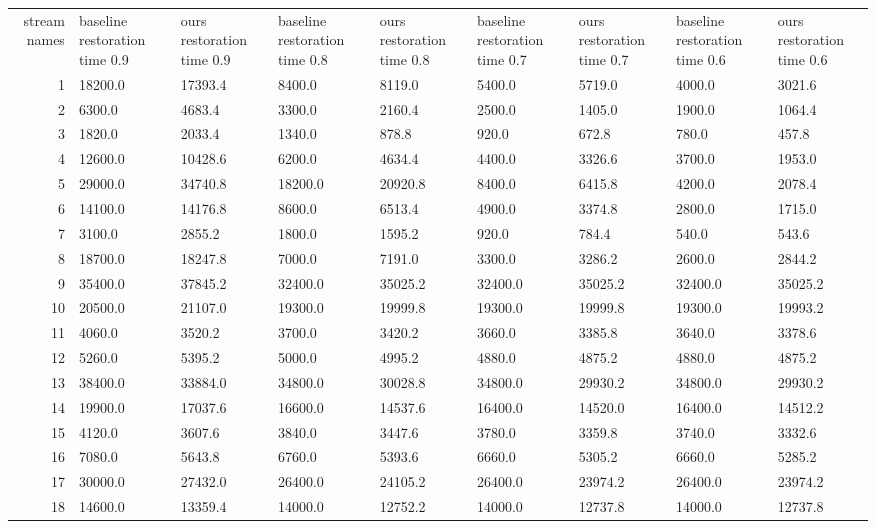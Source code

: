 \begin{tabular}{|r|l|l|l|l|l|l|l|l|}
  \hline
  stream names & baseline restoration time 0.9 & ours restoration time 0.9 & baseline restoration time 0.8 & ours restoration time 0.8 & baseline restoration time 0.7 & ours restoration time 0.7 & baseline restoration time 0.6 & ours restoration time 0.6 \\ 
  1 & 18200.0 & 17393.4 & 8400.0 & 8119.0 & 5400.0 & 5719.0 & 4000.0 & 3021.6 \\ 
  2 & 6300.0 & 4683.4 & 3300.0 & 2160.4 & 2500.0 & 1405.0 & 1900.0 & 1064.4 \\ 
  3 & 1820.0 & 2033.4 & 1340.0 & 878.8 & 920.0 & 672.8 & 780.0 & 457.8 \\ 
  4 & 12600.0 & 10428.6 & 6200.0 & 4634.4 & 4400.0 & 3326.6 & 3700.0 & 1953.0 \\ 
  5 & 29000.0 & 34740.8 & 18200.0 & 20920.8 & 8400.0 & 6415.8 & 4200.0 & 2078.4 \\ 
  6 & 14100.0 & 14176.8 & 8600.0 & 6513.4 & 4900.0 & 3374.8 & 2800.0 & 1715.0 \\ 
  7 & 3100.0 & 2855.2 & 1800.0 & 1595.2 & 920.0 & 784.4 & 540.0 & 543.6 \\ 
  8 & 18700.0 & 18247.8 & 7000.0 & 7191.0 & 3300.0 & 3286.2 & 2600.0 & 2844.2 \\ 
  9 & 35400.0 & 37845.2 & 32400.0 & 35025.2 & 32400.0 & 35025.2 & 32400.0 & 35025.2 \\ 
  10 & 20500.0 & 21107.0 & 19300.0 & 19999.8 & 19300.0 & 19999.8 & 19300.0 & 19993.2 \\ 
  11 & 4060.0 & 3520.2 & 3700.0 & 3420.2 & 3660.0 & 3385.8 & 3640.0 & 3378.6 \\ 
  12 & 5260.0 & 5395.2 & 5000.0 & 4995.2 & 4880.0 & 4875.2 & 4880.0 & 4875.2 \\ 
  13 & 38400.0 & 33884.0 & 34800.0 & 30028.8 & 34800.0 & 29930.2 & 34800.0 & 29930.2 \\ 
  14 & 19900.0 & 17037.6 & 16600.0 & 14537.6 & 16400.0 & 14520.0 & 16400.0 & 14512.2 \\ 
  15 & 4120.0 & 3607.6 & 3840.0 & 3447.6 & 3780.0 & 3359.8 & 3740.0 & 3332.6 \\ 
  16 & 7080.0 & 5643.8 & 6760.0 & 5393.6 & 6660.0 & 5305.2 & 6660.0 & 5285.2 \\ 
  17 & 30000.0 & 27432.0 & 26400.0 & 24105.2 & 26400.0 & 23974.2 & 26400.0 & 23974.2 \\ 
  18 & 14600.0 & 13359.4 & 14000.0 & 12752.2 & 14000.0 & 12737.8 & 14000.0 & 12737.8 \\ 

\end{tabular}
